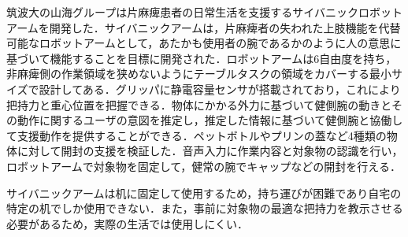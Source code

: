 筑波大の山海グループは片麻痺患者の日常生活を支援するサイバニックロボットアームを開発した\cite{Sankai2017, Sankai2019}．サイバニックアームは，片麻痺者の失われた上肢機能を代替可能なロボットアームとして，あたかも使用者の腕であるかのように人の意思に基づいて機能することを目標に開発された．ロボットアームは6自由度を持ち，非麻痺側の作業領域を狭めないようにテーブルタスクの領域をカバーする最小サイズで設計してある．グリッパに静電容量センサが搭載されており，これにより把持力と重心位置を把握できる．物体にかかる外力に基づいて健側腕の動きとその動作に関するユーザの意図を推定し，推定した情報に基づいて健側腕と協働して支援動作を提供することができる．ペットボトルやプリンの蓋など4種類の物体に対して開封の支援を検証した．音声入力に作業内容と対象物の認識を行い，ロボットアームで対象物を固定して，健常の腕でキャップなどの開封を行える．

サイバニックアームは机に固定して使用するため，持ち運びが困難であり自宅の特定の机でしか使用できない．また，事前に対象物の最適な把持力を教示させる必要があるため，実際の生活では使用しにくい．

